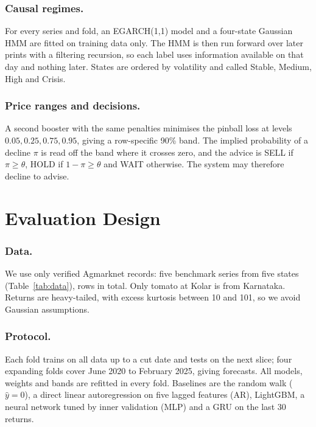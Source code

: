\documentclass[runningheads]{llncs}
\begin{document}
\subsubsection{Causal regimes.} For every series and fold, an EGARCH(1,1) model \cite{nelson1991} and a four-state Gaussian HMM \cite{rabiner1989} are fitted on training data only. The HMM is then run forward over later prints with a filtering recursion, so each label uses information available on that day and nothing later. States are ordered by volatility and called Stable, Medium, High and Crisis.

\subsubsection{Price ranges and decisions.} A second booster with the same penalties minimises the pinball loss \cite{koenker1978} at levels $0.05, 0.25, 0.75, 0.95$, giving a row-specific 90\% band. The implied probability of a decline $\pi$ is read off the band where it crosses zero, and the advice is SELL if $\pi\ge\theta$, HOLD if $1-\pi\ge\theta$ and WAIT otherwise. The system may therefore decline to advise.

\section{Evaluation Design}
\subsubsection{Data.} We use only verified Agmarknet records: five benchmark series from five states (Table~\ref{tab:data}), \NRealRows{} rows in total. Only tomato at Kolar is from Karnataka. Returns are heavy-tailed, with excess kurtosis between 10 and 101, so we avoid Gaussian assumptions.

\begin{table}[!htb]
\centering
\caption{Verified benchmark series. SD$_r$ and Kurt.\ are the standard deviation and excess kurtosis of log-returns between reports.}
\label{tab:data}
\setlength{\tabcolsep}{5pt}
\resizebox{\textwidth}{!}{}
\end{table}

\subsubsection{Protocol.} Each fold trains on all data up to a cut date and tests on the next slice; four expanding folds cover June 2020 to February 2025, giving \NTotal{} forecasts. All models, weights and bands are refitted in every fold. Baselines are the random walk ($\hat y=0$), a direct linear autoregression on five lagged features (AR), LightGBM, a neural network tuned by inner validation (MLP) and a GRU on the last 30 returns.
\end{document}
